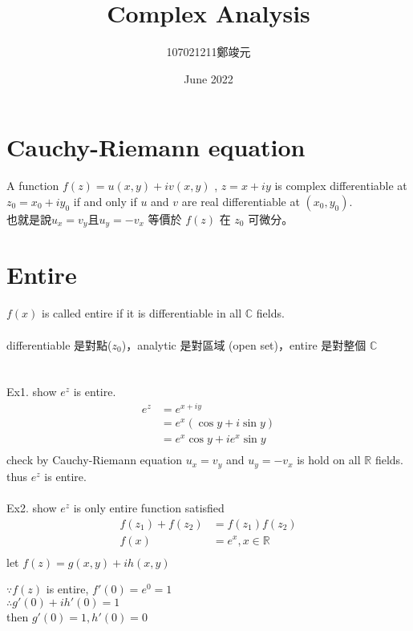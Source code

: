 \documentclass{article}
\title{Complex Analysis}
\author{107021211鄭竣元}
\date{June 2022}
\begin{document}
\maketitle

\section{Cauchy-Riemann equation}
A function $f(z)=u(x,y)+iv(x,y)$ , $z=x+iy$ is complex differentiable at $z_0=x_0+iy_0$ if and only if $u$ and $v$ are real differentiable at $(x_0,y_0)$.\\
也就是說$u_{x}=v_{y}$且$u_{y}=-v_{x}$ 等價於 $f(z)$ 在 $z_0$ 可微分。
\section{Entire}

$f(x)$ is called entire if it is differentiable in all $\mathbb{C}$ fields.\\
\\
differentiable 是對點($z_0$)，analytic 是對區域 (open set)，entire 是對整個 $\mathbb{C}$\\
\\
\\
Ex1. show $e^{z}$ is entire.
\\
\begin{align*} 
e^{z} &=  e^{x+iy} \\ 
&=  e^{x}(\cos{y}+i\sin{y})\\
&= e^{x}\cos{y} + ie^{x}\sin{y}\\
\end{align*}
check by Cauchy-Riemann equation $u_{x}=v_{y}$ and $u_{y}=-v_{x}$ is hold on all $\mathbb{R}$ fields.
thus $e^{z}$ is entire.\\
\\
Ex2. show $e^{z}$ is only entire function satisfied
\begin{align*} 
f(z_{1})+f(z_{2}) &=  f(z_{1})f(z_{2}) \\ 
f(x)&=  e^{x}, x\in \mathbb{R} \\
\end{align*}
let $f(z)=g(x,y)+ih(x,y)$\\

\begin{flushleft}
$\because f(z)$ is entire, $f'(0) =e^{0} = 1$\\
$\therefore  g'(0)+ih'(0) = 1$\\
then $g'(0) = 1, h'(0) = 0$\\
\end{flushleft}
\end{document}

